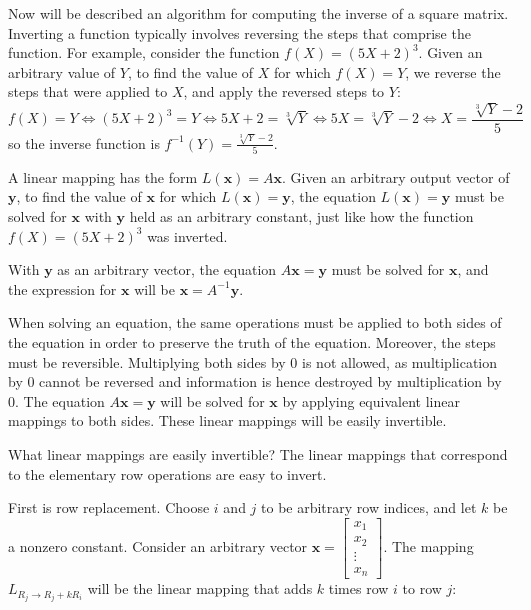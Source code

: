 \documentclass{article}
\begin{document}

Now will be described an algorithm for computing the inverse of a square matrix. Inverting a function typically involves reversing the steps that comprise the function. For example, consider the function \(f(X) = (5X + 2)^3\). Given an arbitrary value of \(Y\), to find the value of \(X\) for which \(f(X) = Y\), we reverse the steps that were applied to \(X\), and apply the reversed steps to \(Y\):
\[f(X) = Y \iff (5X + 2)^3 = Y \iff 5X + 2 = \sqrt[3]{Y} \iff 5X = \sqrt[3]{Y} - 2 \iff X = \frac{\sqrt[3]{Y} - 2}{5}\]
so the inverse function is \(f^{-1}(Y) = \frac{\sqrt[3]{Y} - 2}{5}\).

A linear mapping has the form \(L(\mathbf{x}) = A\mathbf{x}\). Given an arbitrary output vector of \(\mathbf{y}\), to find the value of \(\mathbf{x}\) for which \(L(\mathbf{x}) = \mathbf{y}\), the equation \(L(\mathbf{x}) = \mathbf{y}\) must be solved for \(\mathbf{x}\) with \(\mathbf{y}\) held as an arbitrary constant, just like how the function \(f(X) = (5X + 2)^3\) was inverted.

With \(\mathbf{y}\) as an arbitrary vector, the equation \(A\mathbf{x} = \mathbf{y}\) must be solved for \(\mathbf{x}\), and the expression for \(\mathbf{x}\) will be \(\mathbf{x} = A^{-1}\mathbf{y}\).

When solving an equation, the same operations must be applied to both sides of the equation in order to preserve the truth of the equation. Moreover, the steps must be reversible. Multiplying both sides by \(0\) is not allowed, as multiplication by \(0\) cannot be reversed and information is hence destroyed by multiplication by \(0\). The equation \(A\mathbf{x} = \mathbf{y}\) will be solved for \(\mathbf{x}\) by applying equivalent linear mappings to both sides. These linear mappings will be easily invertible. 

What linear mappings are easily invertible? The linear mappings that correspond to the elementary row operations are easy to invert. 

First is row replacement. Choose \(i\) and \(j\) to be arbitrary row indices, and let \(k\) be a nonzero constant. Consider an arbitrary vector \(\mathbf{x} = \begin{bmatrix} x_1 \\ x_2 \\ \vdots \\ x_n \end{bmatrix}\). The mapping \(L_{R_j \rightarrow R_j + kR_i}\) will be the linear mapping that adds \(k\) times row \(i\) to row \(j\):
\end{document}
